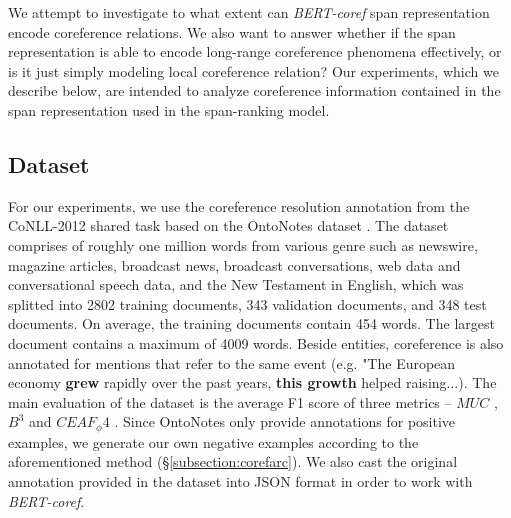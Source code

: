 \documentclass[11pt]{article}
\begin{document}


We attempt to investigate to what extent can \textit{BERT-coref} span representation encode coreference relations. We also want to answer whether if the span representation is able to encode long-range coreference phenomena effectively, or is it just simply modeling local coreference relation? Our experiments, which we describe below, are intended to analyze coreference information contained in the span representation used in the span-ranking model. 

\subsection{Dataset}
For our experiments, we use the coreference resolution annotation
from the CoNLL-2012 shared task based on the OntoNotes dataset \parencite{conll}. The dataset comprises of roughly one million words from various genre such as newswire, magazine articles, broadcast news, broadcast conversations, web data and conversational speech data, and the New Testament in English, which was splitted into 2802 training documents, 343 validation documents, and 348 test documents. On average, the training documents contain 454 words. The largest document contains a maximum of 4009 words. Beside entities, coreference is also annotated for mentions that refer to the same event (e.g. "The European economy \textbf{grew} rapidly over the past years, \textbf{this growth} helped raising...). The main evaluation of the dataset is the average F1 score of three metrics – $MUC$ \parencite{vilain-etal-1995-model}, $B^3$ \parencite{Bagga98algorithmsfor} and $CEAF_ \phi4$ \parencite{luo-2005-coreference}. Since OntoNotes only provide annotations for positive examples, we generate our own negative examples according to the aforementioned method (\S \ref{subsection:corefarc}). We also cast the original annotation provided in the dataset into JSON format in order to work with \textit{BERT-coref}. 
\end{document}

